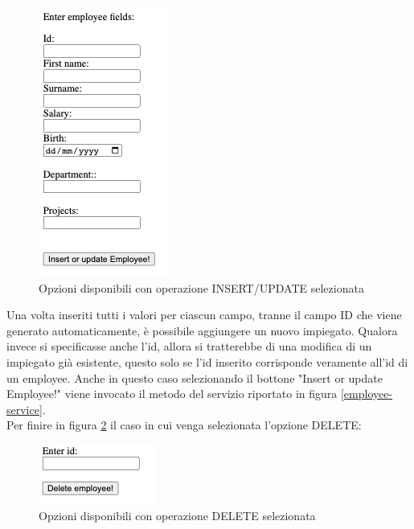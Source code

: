 \FloatBarrier
\begin{figure}[!ht]
\centering
\includegraphics[width=0.3\linewidth]{immagini/postEmployee.png}
\caption{Opzioni disponibili con operazione INSERT/UPDATE selezionata}
\label{post-employee}
\end{figure}
\FloatBarrier
Una volta inseriti tutti i valori per ciascun campo, tranne il campo ID che viene generato automaticamente, è possibile aggiungere un nuovo impiegato. Qualora invece si specificasse anche l'id, allora si tratterebbe di una modifica di un impiegato già esistente, questo solo se l'id inserito corrisponde veramente all'id di un employee. Anche in questo caso selezionando il bottone "Insert or update Employee!" viene invocato il metodo del servizio riportato in figura \ref{employee-service}.\\
Per finire in figura \ref{delete-employee} il caso in cui venga selezionata l'opzione DELETE:
\FloatBarrier
\begin{figure}[!ht]
\centering
\includegraphics[width=0.3\linewidth]{immagini/deleteEmployee.png}
\caption{Opzioni disponibili con operazione DELETE selezionata}
\label{delete-employee}
\end{figure}
\FloatBarrier

